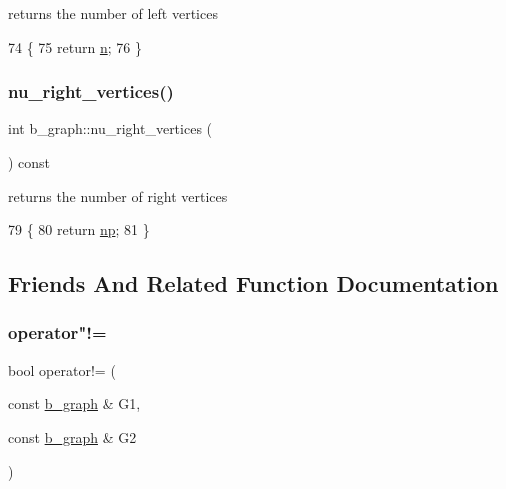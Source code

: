 returns the number of left vertices 


\begin{DoxyCode}
74 \{
75   \textcolor{keywordflow}{return} \hyperlink{classb__graph_a9e211d40c1799bc9b125de472ff06642}{n};
76 \}
\end{DoxyCode}
\mbox{\label{classb__graph_abecfd7d6fbd0d9a554fe0d9aa3241a04}} 
\subsubsection{\texorpdfstring{nu\+\_\+right\+\_\+vertices()}{nu\_right\_vertices()}}
{\footnotesize\ttfamily int b\+\_\+graph\+::nu\+\_\+right\+\_\+vertices (\begin{DoxyParamCaption}{ }\end{DoxyParamCaption}) const}



returns the number of right vertices 


\begin{DoxyCode}
79 \{
80   \textcolor{keywordflow}{return} \hyperlink{classb__graph_acffdd5f20329515eb6ec17ad24f1ca64}{np};
81 \}
\end{DoxyCode}


\subsection{Friends And Related Function Documentation}
\mbox{\label{classb__graph_ab90cd92a2e8f077e4ae18c568bcddd1a}} 
\subsubsection{\texorpdfstring{operator"!=}{operator!=}}
{\footnotesize\ttfamily bool operator!= (\begin{DoxyParamCaption}\item[{const \hyperlink{classb__graph}{b\+\_\+graph} \&}]{G1,  }\item[{const \hyperlink{classb__graph}{b\+\_\+graph} \&}]{G2 }\end{DoxyParamCaption})\hspace{0.3cm}{\ttfamily [friend]}}



